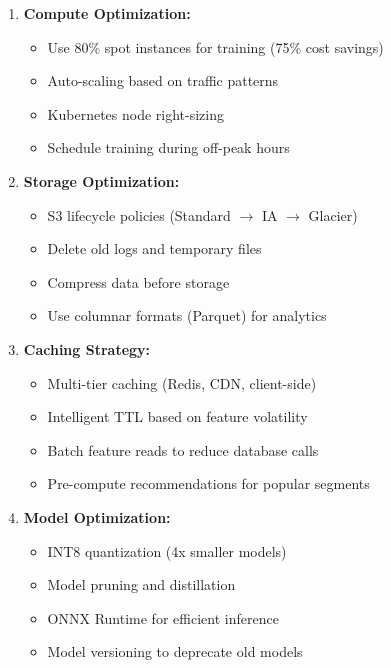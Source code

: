 \begin{enumerate}
    \item \textbf{Compute Optimization:}
    \begin{itemize}
        \item Use 80\% spot instances for training (75\% cost savings)
        \item Auto-scaling based on traffic patterns
        \item Kubernetes node right-sizing
        \item Schedule training during off-peak hours
    \end{itemize}

    \item \textbf{Storage Optimization:}
    \begin{itemize}
        \item S3 lifecycle policies (Standard $\rightarrow$ IA $\rightarrow$ Glacier)
        \item Delete old logs and temporary files
        \item Compress data before storage
        \item Use columnar formats (Parquet) for analytics
    \end{itemize}

    \item \textbf{Caching Strategy:}
    \begin{itemize}
        \item Multi-tier caching (Redis, CDN, client-side)
        \item Intelligent TTL based on feature volatility
        \item Batch feature reads to reduce database calls
        \item Pre-compute recommendations for popular segments
    \end{itemize}

    \item \textbf{Model Optimization:}
    \begin{itemize}
        \item INT8 quantization (4x smaller models)
        \item Model pruning and distillation
        \item ONNX Runtime for efficient inference
        \item Model versioning to deprecate old models
    \end{itemize}
\end{enumerate}

